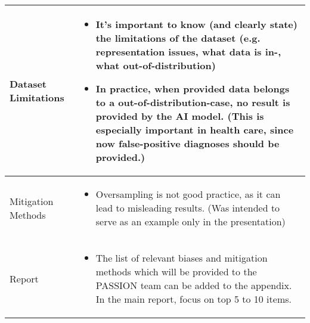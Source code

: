 \documentclass[a4paper,11pt]{article}
\begin{document}
\begin{longtable}{|>{\raggedright\arraybackslash}p{3.5cm}|>{\vspace{-\baselineskip}}p{12cm}|}
		Dataset Limitations &
		\begin{itemize}
			\item It's important to know (and clearly state) the limitations of the dataset (e.g. representation issues, what data is in-, what out-of-distribution)
			\item In practice, when provided data belongs to a out-of-distribution-case, no result is provided by the AI model. (This is especially important in health care, since now false-positive diagnoses should be provided.)
		\end{itemize} \\
		\hline
		
		Mitigation Methods &
		\begin{itemize}
			\item Oversampling is not good practice, as it can lead to misleading results. (Was intended to serve as an example only in the presentation)
		\end{itemize} \\
		\hline
		
		Report &
		\begin{itemize}
			\item The list of relevant biases and mitigation methods which will be provided to the PASSION team can be added to the appendix. In the main report, focus on top 5 to 10 items.
		\end{itemize} \\
		\hline
	\end{longtable}
	
\end{document}
